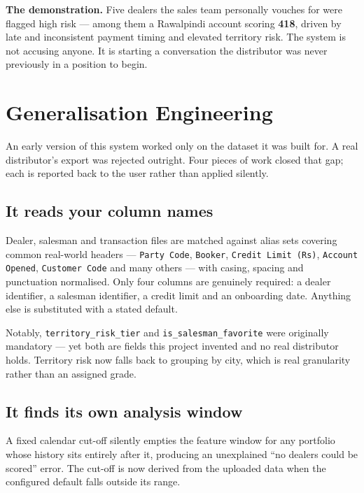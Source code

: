 \documentclass[11pt,a4paper]{article}
\begin{document}
\begin{keybox}
\textbf{The demonstration.} Five dealers the sales team personally vouches for
were flagged high risk --- among them a Rawalpindi account scoring \textbf{418},
driven by late and inconsistent payment timing and elevated territory risk. The
system is not accusing anyone. It is starting a conversation the distributor was
never previously in a position to begin.
\end{keybox}

\section{Generalisation Engineering}

An early version of this system worked only on the dataset it was built for. A
real distributor's export was rejected outright. Four pieces of work closed that
gap; each is reported back to the user rather than applied silently.

\subsection{It reads your column names}

Dealer, salesman and transaction files are matched against alias sets covering
common real-world headers --- \texttt{Party Code}, \texttt{Booker},
\texttt{Credit Limit (Rs)}, \texttt{Account Opened}, \texttt{Customer Code} and
many others --- with casing, spacing and punctuation normalised. Only four
columns are genuinely required: a dealer identifier, a salesman identifier, a
credit limit and an onboarding date. Anything else is substituted with a stated
default.

Notably, \texttt{territory\_risk\_tier} and \texttt{is\_salesman\_favorite} were
originally mandatory --- yet both are fields this project invented and no real
distributor holds. Territory risk now falls back to grouping by city, which is
real granularity rather than an assigned grade.

\subsection{It finds its own analysis window}

A fixed calendar cut-off silently empties the feature window for any portfolio
whose history sits entirely after it, producing an unexplained ``no dealers
could be scored'' error. The cut-off is now derived from the uploaded data when
the configured default falls outside its range.
\end{document}
